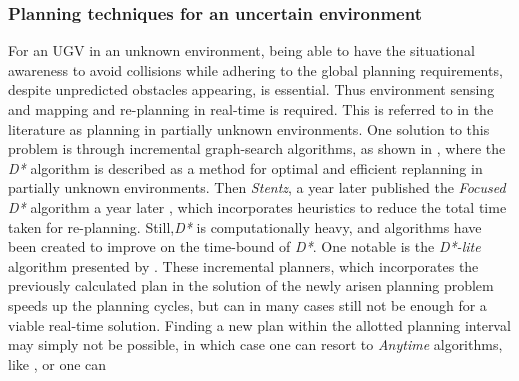 \subsubsection{Planning techniques for an uncertain environment} 
For an UGV in an unknown environment, being able to have the situational
awareness to avoid collisions while adhering to the global planning
requirements, despite unpredicted obstacles appearing, is essential. Thus
environment sensing and mapping and re-planning in real-time is required. This
is referred to in the literature as planning in partially unknown environments.
One solution to this problem is through incremental graph-search algorithms, as
shown in \cite[Stentz]{stentz_optimal}, where the \textsl{D*} algorithm is
described as a method for optimal and efficient replanning in partially unknown
environments. Then \textit{Stentz}, a year later published the \textit{Focused
  D*} algorithm a year later \cite{stentz1995focussed}, which incorporates
heuristics to reduce the total time taken for re-planning. Still,\textit{D*} is computationally heavy, and algorithms have
been created to improve on the time-bound of \textit{D*}. One notable is the
\textit{D*-lite} algorithm presented by \cite[Koenig]{koenig2002d}. These
incremental planners, which incorporates the previously calculated plan in the
solution of the newly arisen planning problem speeds up the planning cycles, but
can in many cases still not be enough for a viable real-time solution. Finding a
new plan within the allotted planning interval may simply not be possible, in
which case one can resort to \textit{Anytime} algorithms, like \cite[Karaman et.
al]{karaman_anytime_2011}, or one can

